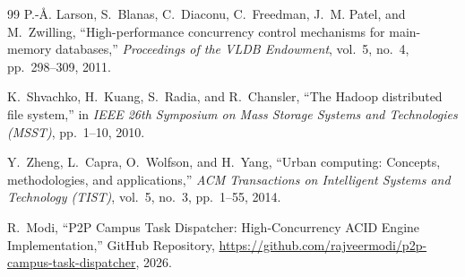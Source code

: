 \documentclass[conference]{IEEEtran}
\begin{document}
\begin{thebibliography}{99}
P.-{\AA}. Larson, S.~Blanas, C.~Diaconu, C.~Freedman, J.~M. Patel, and M.~Zwilling, ``High-performance concurrency control mechanisms for main-memory databases,'' \emph{Proceedings of the VLDB Endowment}, vol.~5, no.~4, pp.~298--309, 2011.

K.~Shvachko, H.~Kuang, S.~Radia, and R.~Chansler, ``The Hadoop distributed file system,'' in \emph{IEEE 26th Symposium on Mass Storage Systems and Technologies (MSST)}, pp.~1--10, 2010.

Y.~Zheng, L.~Capra, O.~Wolfson, and H.~Yang, ``Urban computing: Concepts, methodologies, and applications,'' \emph{ACM Transactions on Intelligent Systems and Technology (TIST)}, vol.~5, no.~3, pp.~1--55, 2014.

R.~Modi, ``P2P Campus Task Dispatcher: High-Concurrency ACID Engine Implementation,'' GitHub Repository, \url{https://github.com/rajveermodi/p2p-campus-task-dispatcher}, 2026.

\end{thebibliography}
\end{document}
